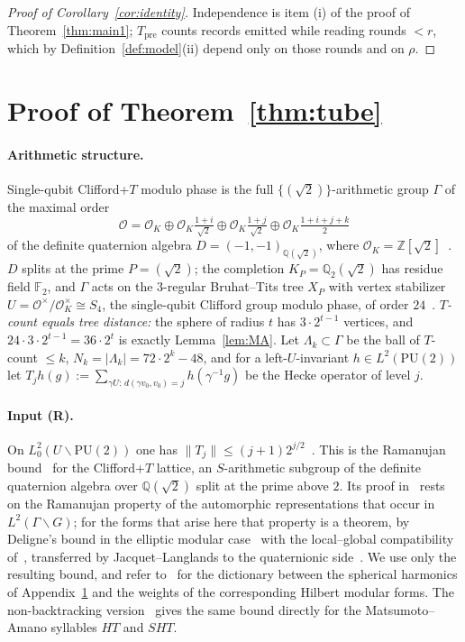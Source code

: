 \documentclass[aps,prx,twocolumn,superscriptaddress,nofootinbib,longbibliography]{revtex4-2}
\theoremstyle{plain}
\theoremstyle{definition}
\theoremstyle{remark}
\newcommand{\Tpre}{T_{\mathrm{pre}}}
\newcommand{\Z}{\mathbb{Z}}
\newcommand{\Q}{\mathbb{Q}}
\newcommand{\F}{\mathbb{F}}
\newcommand{\PU}{\mathrm{PU}(2)}
\begin{document}
\begin{proof}[Proof of Corollary~\ref{cor:identity}]
Independence is item (i) of the proof of Theorem~\ref{thm:main1}; $\Tpre$ counts records emitted while reading rounds $<r$, which by Definition~\ref{def:model}(ii) depend only on those rounds and on $\rho$.
\end{proof}

\section{Proof of Theorem~\ref{thm:tube}}\label{app:tube}

\paragraph{Arithmetic structure.} Single-qubit Clifford+$T$ modulo phase is the full $\{(\sqrt2)\}$-arithmetic group $\Gamma$ of the maximal order
\begin{equation}
\mathcal O=\mathcal O_K\oplus\mathcal O_K\tfrac{1+i}{\sqrt2}\oplus\mathcal O_K\tfrac{1+j}{\sqrt2}\oplus\mathcal O_K\tfrac{1+i+j+k}{2}\label{eq:order}
\end{equation}
of the definite quaternion algebra $D=(-1,-1)_{\Q(\sqrt2)}$, where $\mathcal O_K=\Z[\sqrt2]$~\cite{KMM13,PS18}. $D$ splits at the prime $P=(\sqrt2)$; the completion $K_P=\Q_2(\sqrt2)$ has residue field $\F_2$, and $\Gamma$ acts on the $3$-regular Bruhat--Tits tree $X_P$ with vertex stabilizer $U=\mathcal O^\times/\mathcal O_K^\times\cong S_4$, the single-qubit Clifford group modulo phase, of order $24$~\cite[\S4.1.3]{PS18}. \emph{$T$-count equals tree distance:} the sphere of radius $t$ has $3\cdot2^{t-1}$ vertices, and $24\cdot3\cdot2^{t-1}=36\cdot2^t$ is exactly Lemma~\ref{lem:MA}. Let $\Lambda_k\subset\Gamma$ be the ball of $T$-count $\le k$, $N_k=|\Lambda_k|=72\cdot2^k-48$, and for a left-$U$-invariant $h\in L^2(\PU)$ let $T_jh(g):=\sum_{\gamma U:\,d(\gamma v_0,v_0)=j}h(\gamma^{-1}g)$ be the Hecke operator of level $j$.

\paragraph{Input (R).} On $L^2_0(U\backslash\PU)$ one has $\|T_j\|\le(j+1)2^{j/2}$~\cite[Eq.~(3.10)]{PS18}. This is the Ramanujan bound~\cite{LPS} for the Clifford+$T$ lattice, an $S$-arithmetic subgroup of the definite quaternion algebra over $\Q(\sqrt2)$ split at the prime above $2$. Its proof in~\cite{PS18} rests on the Ramanujan property of the automorphic representations that occur in $L^2(\Gamma\backslash G)$; for the forms that arise here that property is a theorem, by Deligne's bound in the elliptic modular case~\cite{Deligne} with the local--global compatibility of~\cite{HarrisTaylor}, transferred by Jacquet--Langlands to the quaternionic side~\cite{Blasius}. We use only the resulting bound, and refer to~\cite[Sec.~3]{PS18} for the dictionary between the spherical harmonics of Appendix~\ref{app:tube} and the weights of the corresponding Hilbert modular forms. The non-backtracking version~\cite[Eqs.~(5.2)--(5.3)]{PS18} gives the same bound directly for the Matsumoto--Amano syllables $HT$ and $SHT$.
\end{document}
